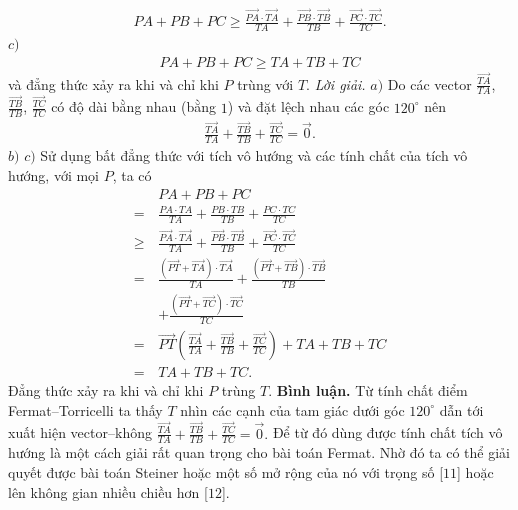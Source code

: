\begin{multicols}{2}
\begin{align*}
		PA\!+\! PB\!+\!PC \!\ge\! \frac{\overrightarrow{PA}\!\cdot\!\overrightarrow{TA}}{TA}\!+\!\frac{\overrightarrow{PB}\!\cdot\! \overrightarrow{TB}}{TB}\!+\!\frac{\overrightarrow{PC}\!\cdot\!\overrightarrow{TC}}{TC}.
	\end{align*}
	$c)$
	\begin{align*}
		PA+PB+PC\ge TA+TB+TC
	\end{align*}
	và đẳng thức xảy ra khi và chỉ khi $P$ trùng với $T$. 
	\vskip 0.1cm
	\textit{Lời giải.} $a)$ Do các vector $\frac{\overrightarrow{TA}}{TA}$, $\frac{\overrightarrow{TB}}{TB}$, $\frac{\overrightarrow{TC}}{TC}$ có độ dài bằng nhau (bằng $1$) và đặt lệch nhau các góc $120^\circ$ nên
	\begin{align*}
		\frac{\overrightarrow{TA}}{TA}+\frac{\overrightarrow{TB}}{TB}+\frac{\overrightarrow{TC}}{TC}=\overrightarrow{0}.
	\end{align*}
	$b)$ $c)$ Sử dụng bất đẳng thức với tích vô hướng và các tính chất của tích vô hướng, với mọi $P$, ta có
		\begin{align*}
			&PA+PB+PC\\[-0.2ex]
			=\,&\frac{PA\cdot TA}{TA}+\frac{PB\cdot TB}{TB}+\frac{PC\cdot TC}{TC}\\[-0.2ex]
			\ge\,& \frac{\overrightarrow{PA}\cdot\overrightarrow{TA}}{TA}+\frac{\overrightarrow{PB}\cdot \overrightarrow{TB}}{TB}+\frac{\overrightarrow{PC}\cdot\overrightarrow{TC}}{TC}\\[-0.2ex]
			=\,&\frac{\left(\overrightarrow{PT}+\overrightarrow{TA}\right)\cdot\overrightarrow{TA}}{TA}+\frac{\left(\overrightarrow{PT}+\overrightarrow{TB}\right)\cdot\overrightarrow{TB}}{TB}\\[-0.2ex]
			&+\frac{\left(\overrightarrow{PT}+\overrightarrow{TC}\right)\cdot\overrightarrow{TC}}{TC}\\[-0.2ex]
			=\,&\overrightarrow{PT}\!\left(\!\frac{\overrightarrow{TA}}{TA}\!+\!\frac{\overrightarrow{TB}}{TB}\!+\!\frac{\overrightarrow{TC}}{TC}\!\right)\!+\!TA\!+\!TB\!+\!TC\\[-0.2ex]
			=\,&TA+TB+TC.
		\end{align*}
		Đẳng thức xảy ra khi và chỉ khi $P$ trùng $T$.
	\vskip 0.1cm
	{\bf\color{cackithi} Bình luận.} Từ tính chất điểm Fermat--Torricelli ta thấy $T$ nhìn các cạnh của tam giác dưới góc $120^\circ$ dẫn tới xuất hiện vector--không $\frac{\overrightarrow{TA}}{TA}+\frac{\overrightarrow{TB}}{TB}+\frac{\overrightarrow{TC}}{TC}=\overrightarrow{0}.$ Để từ đó dùng được tính chất tích vô hướng là một cách giải rất quan trọng cho bài toán Fermat. Nhờ đó ta có thể giải quyết được bài toán Steiner hoặc một số mở rộng của nó với trọng số [$11$] hoặc lên không gian nhiều chiều hơn [$12$].

\end{multicols}

